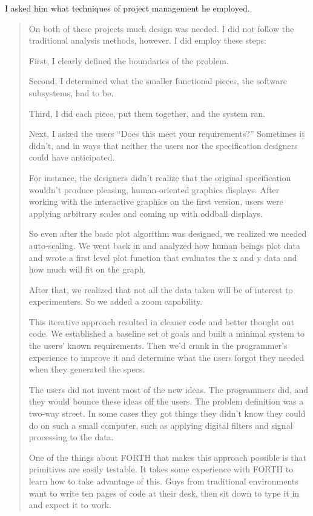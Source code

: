 I asked him what techniques of project management he employed.

\begin{quotation}
\noindent On both of these projects much design was needed. I did not follow the
traditional analysis methods, however. I did employ these steps:

\noindent First, I clearly defined the boundaries of the problem.

\noindent Second, I determined what the smaller functional pieces, the software
subsystems, had to be.

\noindent Third, I did each piece, put them together, and the system ran.

\noindent Next, I asked the users ``Does this meet your requirements?'' Sometimes it
didn't, and in ways that neither the users nor the specification designers
could have anticipated.

\noindent For instance, the designers didn't realize that the original
specification wouldn't produce pleasing, human-oriented graphics
displays. After working with the interactive graphics on the first
version, users were applying arbitrary scales and coming up with
oddball displays.

\noindent So even after the basic plot algorithm was designed, we realized we
needed auto-scaling. We went back in and analyzed how human beings
plot data and wrote a first level plot function that evaluates the x
and y data and how much will fit on the graph.

\noindent After that, we realized that not all the data taken will be of
interest to experimenters. So we added a zoom capability.

\noindent This iterative approach resulted in cleaner code and better thought
out code. We established a baseline set of goals and built a minimal
system to the users' known requirements. Then we'd crank in the
programmer's experience to improve it and determine what the users
forgot they needed when they generated the specs.

\noindent The users did not invent most of the new ideas. The programmers did,
and they would bounce these ideas off the users. The problem
definition was a two-way street. In some cases they got things they
didn't know they could do on such a small computer, such as applying
digital filters and signal processing to the data.

\noindent One of the things about FORTH that makes this approach possible is
that primitives are easily testable. It takes some experience with
FORTH to learn how to take advantage of this. Guys from traditional
environments want to write ten pages of code at their desk, then sit
down to type it in and expect it to work.


\end{quotation}
